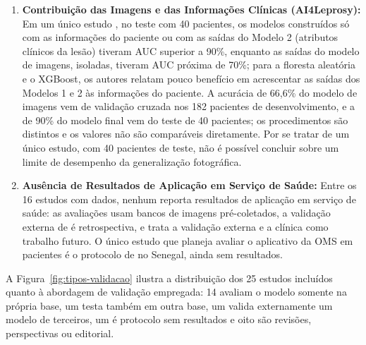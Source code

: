 \begin{enumerate}
    \item \textbf{Contribuição das Imagens e das Informações Clínicas (AI4Leprosy):} Em um único estudo , no teste com 40 pacientes, os modelos construídos só com as informações do paciente ou com as saídas do Modelo 2 (atributos clínicos da lesão) tiveram AUC superior a 90\%, enquanto as saídas do modelo de imagens, isoladas, tiveram AUC próxima de 70\%; para a floresta aleatória e o XGBoost, os autores relatam pouco benefício em acrescentar as saídas dos Modelos 1 e 2 às informações do paciente. A acurácia de 66,6\% do modelo de imagens vem de validação cruzada nos 182 pacientes de desenvolvimento, e a de 90\% do modelo final vem do teste de 40 pacientes; os procedimentos são distintos e os valores não são comparáveis diretamente. Por se tratar de um único estudo, com 40 pacientes de teste, não é possível concluir sobre um limite de desempenho da generalização fotográfica.

    \item \textbf{Ausência de Resultados de Aplicação em Serviço de Saúde:} Entre os 16 estudos com dados, nenhum reporta resultados de aplicação em serviço de saúde: as avaliações usam bancos de imagens pré-coletados, a validação externa de  é retrospectiva, e  trata a validação externa e a clínica como trabalho futuro. O único estudo que planeja avaliar o aplicativo da OMS em pacientes é o protocolo de  no Senegal, ainda sem resultados.
\end{enumerate}

A Figura~\ref{fig:tipos-validacao} ilustra a distribuição dos 25 estudos incluídos quanto à abordagem de validação empregada: 14 avaliam o modelo somente na própria base, um testa também em outra base, um valida externamente um modelo de terceiros, um é protocolo sem resultados e oito são revisões, perspectivas ou editorial.

